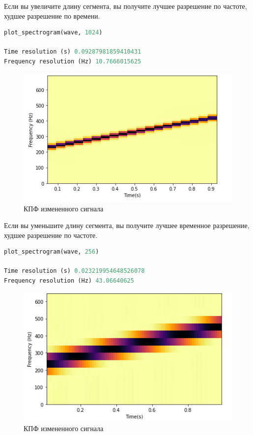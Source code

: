 Если вы увеличите длину сегмента, вы получите лучшее разрешение по частоте, худшее разрешение по времени.

\begin{lstlisting}[language=Python]
plot_spectrogram(wave, 1024)

Time resolution (s) 0.09287981859410431
Frequency resolution (Hz) 10.7666015625
\end{lstlisting}

\begin{figure}[H]
	\begin{center}
		\includegraphics[scale=1]{fig/lab03/lab03_08.png}
		\caption{КПФ измененного сигнала}
	\end{center}
\end{figure}

Если вы уменьшите длину сегмента, вы получите лучшее временное разрешение, худшее разрешение по частоте.

\begin{lstlisting}[language=Python]
plot_spectrogram(wave, 256)

Time resolution (s) 0.023219954648526078
Frequency resolution (Hz) 43.06640625
\end{lstlisting}

\begin{figure}[H]
	\begin{center}
		\includegraphics[scale=1]{fig/lab03/lab03_09.png}
		\caption{КПФ измененного сигнала}
	\end{center}
\end{figure}


